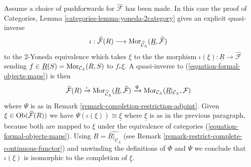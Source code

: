 \begin{remark}
\medskip \noindent
Assume a choice of pushforwards for $\widehat{\mathcal{F}}$ has been made.
In this case the proof of
Categories, Lemma \ref{categories-lemma-yoneda-2category}
gives an explicit quasi-inverse
$$
\iota :
\widehat{\mathcal{F}}(R) \longrightarrow
\mathop{\rm Mor}\nolimits_{\widehat{\mathcal{C}}_\Lambda}(
\underline{R}, \widehat{\mathcal{F}})
$$
to the 2-Yoneda equivalence which takes $\xi$ to the the morphism
$\iota(\xi) : \underline{R} \to \widehat{\mathcal{F}}$ sending
$f \in \underline{R}(S) = \mathop{\rm Mor}\nolimits_{\mathcal{C}_\Lambda}(R, S)$
to $f_*\xi$. A quasi-inverse to (\ref{equation-formal-objects-maps})
is then
$$
\widehat{\mathcal{F}}(R)
\xrightarrow {\iota}
\mathop{\rm Mor}\nolimits_{\widehat{\mathcal{C}}_\Lambda}(
\underline{R}, \widehat{\mathcal{F}})
\xrightarrow{\Psi}
\mathop{\rm Mor}\nolimits_{\mathcal{C}_\Lambda}(
\underline{R}|_{\mathcal{C}_\Lambda}, \mathcal{F})
$$
where $\Psi$ is as in
Remark \ref{remark-completion-restriction-adjoint}.
Given $\xi \in \mathop{\rm Ob}\nolimits(\widehat{\mathcal{F}}(R))$ we have
$\Psi(\iota(\xi)) \cong \underline{\xi}$ where $\underline{\xi}$
is as in the previous paragraph, because both are mapped to $\xi$
under the equivalence of categories (\ref{equation-formal-objects-maps}).
Using $\underline{R} = \widehat{\underline{R}|_{\mathcal{C}_\Lambda}}$
(see Remark \ref{remark-restrict-complete-continuous-functor})
and unwinding the definitions of $\Phi$ and $\Psi$ we conclude that
$\iota(\xi)$ is isomorphic to the completion of $\underline{\xi}$.
\end{remark}

